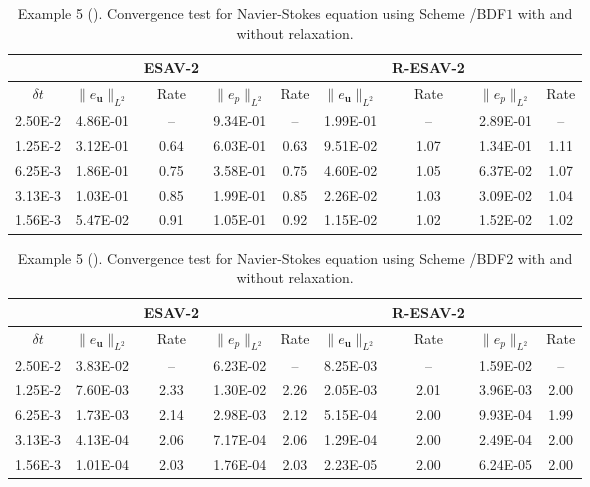 \documentclass[final,review,onefignum,onetabnum]{siamart190516}
\theoremstyle{plain}
\begin{document}
\linespread{1.2}
\begin{table}[!h] 
	\centering
	\caption{Example 5 (). Convergence test for Navier-Stokes equation using Scheme \uppercase\expandafter{}/BDF$1$ with and without relaxation.}
	 \label{table:NS-scheme2-1st}
	\begin{tabular}{||c||cccc||cccc||}
		\hline
	& & ESAV-2 & & & & R-ESAV-2 & & \\
		\hline
	$\delta t$ & $\|e_{\mathbf{u}}\|_{L^{2}}$ & Rate & $\|e_{p}\|_{L^{2}}$ & Rate & $\|e_{\mathbf{u}}\|_{L^{2}}$ & Rate & $\|e_{p}\|_{L^{2}}$ & Rate\\
		\hline
	2.50E-2  & 4.86E-01 &  --    & 9.34E-01   & --    & 1.99E-01 &  --    & 2.89E-01   & -- \\
	1.25E-2  & 3.12E-01 &  0.64  & 6.03E-01   & 0.63  & 9.51E-02 &  1.07  & 1.34E-01   & 1.11\\
	6.25E-3  & 1.86E-01 &  0.75  & 3.58E-01   & 0.75  & 4.60E-02 &  1.05  & 6.37E-02   & 1.07\\
	3.13E-3  & 1.03E-01 &  0.85  & 1.99E-01   & 0.85  & 2.26E-02 &  1.03  & 3.09E-02   & 1.04\\
	1.56E-3  & 5.47E-02 &  0.91  & 1.05E-01   & 0.92  & 1.15E-02 &  1.02  & 1.52E-02   & 1.02\\
	\hline
	\end{tabular}
\end{table}


\linespread{1.2}
\begin{table}[!h] 
	\centering
	\caption{Example 5 (). Convergence test for Navier-Stokes equation using Scheme \uppercase\expandafter{}/BDF$2$ with and without relaxation.}
	 \label{table:NS-scheme2-2nd}
	\begin{tabular}{||c||cccc||cccc||}
		\hline
	& & ESAV-2 & & & & R-ESAV-2 & & \\
		\hline
	$\delta t$ & $\|e_{\mathbf{u}}\|_{L^{2}}$ & Rate & $\|e_{p}\|_{L^{2}}$ & Rate & $\|e_{\mathbf{u}}\|_{L^{2}}$ & Rate & $\|e_{p}\|_{L^{2}}$ & Rate\\
		\hline
	2.50E-2  & 3.83E-02 &  --    & 6.23E-02   & --    & 8.25E-03 &  --    & 1.59E-02   & -- \\
	1.25E-2  & 7.60E-03 &  2.33  & 1.30E-02   & 2.26  & 2.05E-03 &  2.01  & 3.96E-03   & 2.00\\
	6.25E-3  & 1.73E-03 &  2.14  & 2.98E-03   & 2.12  & 5.15E-04 &  2.00  & 9.93E-04   & 1.99\\
	3.13E-3  & 4.13E-04 &  2.06  & 7.17E-04   & 2.06  & 1.29E-04 &  2.00  & 2.49E-04   & 2.00\\
	1.56E-3  & 1.01E-04 &  2.03  & 1.76E-04   & 2.03  & 2.23E-05 &  2.00  & 6.24E-05   & 2.00\\
	\hline
	\end{tabular}
\end{table}
\end{document}
